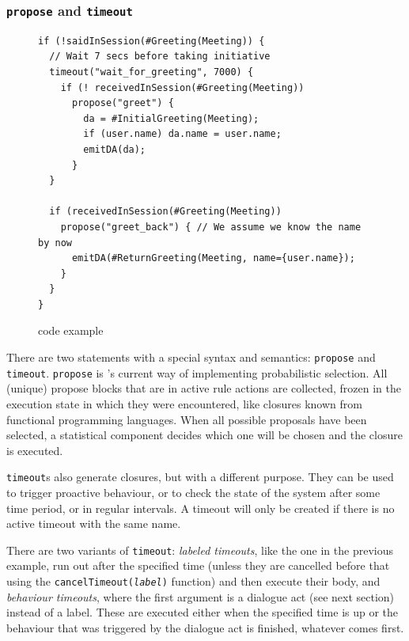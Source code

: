 \subsubsection{\texttt{propose} and \texttt{timeout}}
\begin{figure}[htbp]
  \centering\small%
\begin{lstlisting}
if (!saidInSession(#Greeting(Meeting)) {
  // Wait 7 secs before taking initiative
  timeout("wait_for_greeting", 7000) {
    if (! receivedInSession(#Greeting(Meeting))
      propose("greet") {
        da = #InitialGreeting(Meeting);
        if (user.name) da.name = user.name;
        emitDA(da);
      }
  }

  if (receivedInSession(#Greeting(Meeting))
    propose("greet_back") { // We assume we know the name by now
      emitDA(#ReturnGreeting(Meeting, name={user.name});
    }
  }
}
\end{lstlisting}\vspace*{-3ex}
  \caption{\vonda code example}
  \label{fig:propose}
\end{figure}

There are two statements with a special syntax and semantics: \texttt{propose}
and \texttt{timeout}. \texttt{propose} is \vonda's current way of implementing
probabilistic selection. All (unique) propose blocks that are in active rule
actions are collected, frozen in the execution state in which they were
encountered, like closures known from functional programming languages. When
all possible proposals have been selected, a statistical component decides
which one will be chosen and the closure is executed.

\texttt{timeout}s also generate closures, but with a different purpose. They
can be used to trigger proactive behaviour, or to check the state of the system
after some time period, or in regular intervals. A timeout will only be created
if there is no active timeout with the same name.

There are two variants of \texttt{timeout}: \emph{labeled timeouts}, like the
one in the previous example, run out after the specified time (unless they are
cancelled before that using the \texttt{cancelTimeout(\emph{label})} function)
and then execute their body, and \emph{behaviour timeouts}, where the first
argument is a dialogue act (see next section) instead of a label. These are
executed either when the specified time is up or the behaviour that was
triggered by the dialogue act is finished, whatever comes first.

